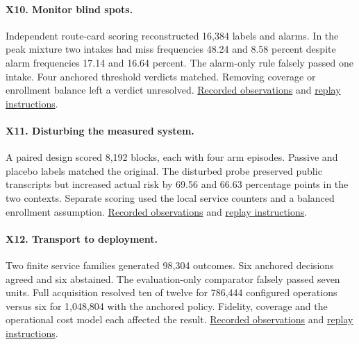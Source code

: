 \paragraph{X10. Monitor blind spots.} Independent route-card scoring reconstructed 16,384 labels and alarms. In the peak mixture two intakes had miss frequencies 48.24 and 8.58 percent despite alarm frequencies 17.14 and 16.64 percent. The alarm-only rule falsely passed one intake. Four anchored threshold verdicts matched. Removing coverage or enrollment balance left a verdict unresolved. \href{https://github.com/Perceptive-Closure/PC-X/blob/4a16ef37d0e90e856560ce153c0fd690c28016b6/EXPERIMENTS/EXP-X10/results/opening.json}{Recorded observations} and \href{https://github.com/Perceptive-Closure/PC-X/blob/4a16ef37d0e90e856560ce153c0fd690c28016b6/EXPERIMENTS/EXP-X10/README.md}{replay instructions}.

\paragraph{X11. Disturbing the measured system.} A paired design scored 8,192 blocks, each with four arm episodes. Passive and placebo labels matched the original. The disturbed probe preserved public transcripts but increased actual risk by 69.56 and 66.63 percentage points in the two contexts. Separate scoring used the local service counters and a balanced enrollment assumption. \href{https://github.com/Perceptive-Closure/PC-X/blob/01f174c14669c92cd1c06dbf5158db29c4720b6d/EXPERIMENTS/EXP-X11/results/opening.json}{Recorded observations} and \href{https://github.com/Perceptive-Closure/PC-X/blob/01f174c14669c92cd1c06dbf5158db29c4720b6d/EXPERIMENTS/EXP-X11/README.md}{replay instructions}.

\paragraph{X12. Transport to deployment.} Two finite service families generated 98,304 outcomes. Six anchored decisions agreed and six abstained. The evaluation-only comparator falsely passed seven units. Full acquisition resolved ten of twelve for 786,444 configured operations versus six for 1,048,804 with the anchored policy. Fidelity, coverage and the operational cost model each affected the result. \href{https://github.com/Perceptive-Closure/PC-X/blob/486671cfcb52405ad226de553ce1df992f66b4fc/EXPERIMENTS/EXP-X12/results/summary.json}{Recorded observations} and \href{https://github.com/Perceptive-Closure/PC-X/blob/486671cfcb52405ad226de553ce1df992f66b4fc/EXPERIMENTS/EXP-X12/README.md}{replay instructions}.

